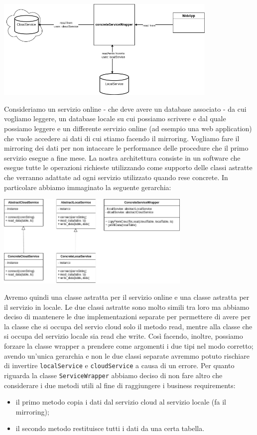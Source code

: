 \documentclass[a4paper]{article}
\begin{document}
\begin{center}
    \includegraphics[width=0.8\textwidth]{imgs/situazioneIniziale.png}
\end{center}

Consideriamo un servizio online - che deve avere un database associato - da cui vogliamo leggere, un database
locale su cui possiamo scrivere e dal quale possiamo leggere e un differente servizio online (ad esempio una web application) che vuole accedere ai
dati di cui stiamo facendo il mirroring. Vogliamo fare il mirroring dei dati per non intaccare
le performance delle procedure che il primo servizio esegue a fine mese. La
nostra architettura consiste in un software che esegue
tutte le operazioni richieste utilizzando come supporto delle classi astratte che verranno adattate ad ogni
servizio utilizzato quando rese concrete. In particolare abbiamo immaginato la seguente gerarchia:

\begin{center}
    \includegraphics[width=0.7\textwidth]{imgs/gerarchiaAstratta.png}
\end{center}

Avremo quindi una classe astratta per il servizio online e una classe astratta
per il servizio in locale. Le due
classi astratte sono molto simili tra loro ma abbiamo deciso di mantenere le due implementazioni
separate per permettere di avere per la
classe che si occupa del servio cloud solo il metodo read, mentre alla classe che si occupa del servizio locale
sia read che write. Così facendo, inoltre, possiamo forzare la classe wrapper a prendere come
argomenti i due tipi nel modo corretto; avendo un'unica gerarchia e non le due classi separate
avremmo potuto rischiare di invertire \texttt{localService} e
\texttt{cloudService} a causa di un errore.
Per quanto riguarda la classe \texttt{ServiceWrapper} abbiamo deciso di non
fare altro che considerare
i due metodi utili al fine di raggiungere i business requirements:
\begin{itemize}
    \item il primo metodo copia i dati dal servizio cloud al servizio locale
    (fa il mirroring);
    \item il secondo metodo restituisce tutti i dati da una certa tabella.
\end{itemize}
\end{document}
